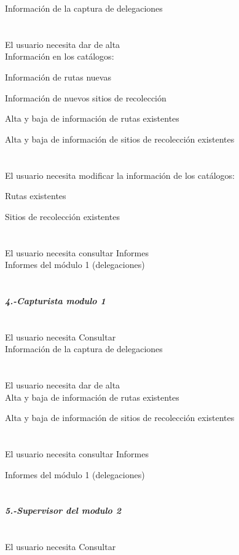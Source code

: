 \textbullet Información de la captura de delegaciones\\\\\\
\textbullet El usuario necesita dar de alta\\

\textbullet Información en los catálogos:

\textbullet Información de rutas nuevas

\textbullet Información de nuevos sitios de recolección

\textbullet Alta y baja de información de rutas existentes

\textbullet Alta y baja de información de sitios de recolección existentes\\\\\\
\textbullet El usuario necesita modificar  la información de los catálogos:

\textbullet Rutas existentes

\textbullet Sitios de recolección existentes\\\\\\
\textbullet El usuario necesita consultar Informes\\
\textbullet Informes del módulo 1 (delegaciones)\\\\\\
{\large \textit{\textbf{4.-Capturista modulo 1}}}\\\\\\
\textbullet El usuario necesita Consultar \\

\textbullet Información de la captura de delegaciones\\\\\\
\textbullet El usuario necesita dar de alta\\

\textbullet Alta y baja de información de rutas existentes

\textbullet Alta y baja de información de sitios de recolección existentes\\\\\\
\textbullet El usuario necesita consultar Informes

\textbullet Informes del módulo 1 (delegaciones)\\\\\\
{\large \textit{\textbf{5.-Supervisor del modulo 2}}}\\\\\\
\textbullet El usuario necesita Consultar \\

